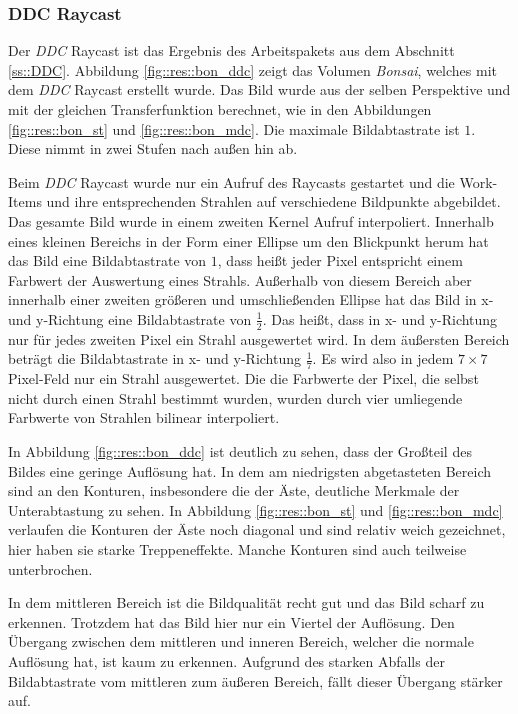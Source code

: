 \subsubsection{DDC Raycast}\label{ss::res::ddc}
Der \emph{DDC} Raycast ist das Ergebnis des Arbeitspakets aus dem Abschnitt \ref{ss::DDC}.
Abbildung \ref{fig::res::bon_ddc} zeigt das Volumen \emph{Bonsai}, welches mit dem \emph{DDC} Raycast erstellt wurde.
Das Bild wurde aus der selben Perspektive und mit der gleichen Transferfunktion berechnet, wie in den Abbildungen \ref{fig::res::bon_st} und \ref{fig::res::bon_mdc}.
Die maximale Bildabtastrate ist $1$.
Diese nimmt in zwei Stufen nach außen hin ab.

Beim \emph{DDC} Raycast wurde nur ein Aufruf des Raycasts gestartet und die Work-Items und ihre entsprechenden Strahlen auf verschiedene Bildpunkte abgebildet.
Das gesamte Bild wurde in einem zweiten Kernel Aufruf interpoliert.
Innerhalb eines kleinen Bereichs in der Form einer Ellipse um den Blickpunkt herum hat das Bild eine Bildabtastrate von $1$, dass heißt jeder Pixel entspricht einem Farbwert der Auswertung eines Strahls.
Außerhalb von diesem Bereich aber innerhalb einer zweiten größeren und umschließenden Ellipse hat das Bild in x- und y-Richtung eine Bildabtastrate von $\frac{1}{2}$.
Das heißt, dass in x- und y-Richtung nur für jedes zweiten Pixel ein Strahl ausgewertet wird.
In dem äußersten Bereich beträgt die Bildabtastrate in x- und y-Richtung $\frac{1}{7}$.
Es wird also in jedem $7\times7$\,Pixel-Feld nur ein Strahl ausgewertet.
Die die Farbwerte der Pixel, die selbst nicht durch einen Strahl bestimmt wurden, wurden durch vier umliegende Farbwerte von Strahlen bilinear interpoliert.

In Abbildung \ref{fig::res::bon_ddc} ist deutlich zu sehen, dass der Großteil des Bildes eine geringe Auflösung hat.
In dem am niedrigsten abgetasteten Bereich sind an den Konturen, insbesondere die der Äste, deutliche Merkmale der Unterabtastung zu sehen.
In Abbildung \ref{fig::res::bon_st} und \ref{fig::res::bon_mdc} verlaufen die Konturen der Äste noch diagonal und sind relativ weich gezeichnet, hier haben sie starke Treppeneffekte.
Manche Konturen sind auch teilweise unterbrochen.

In dem mittleren Bereich ist die Bildqualität recht gut und das Bild scharf zu erkennen.
Trotzdem hat das Bild hier nur ein Viertel der Auflösung.
Den Übergang zwischen dem mittleren und inneren Bereich, welcher die normale Auflösung hat, ist kaum zu erkennen.
Aufgrund des starken Abfalls der Bildabtastrate vom mittleren zum äußeren Bereich, fällt dieser Übergang stärker auf.

